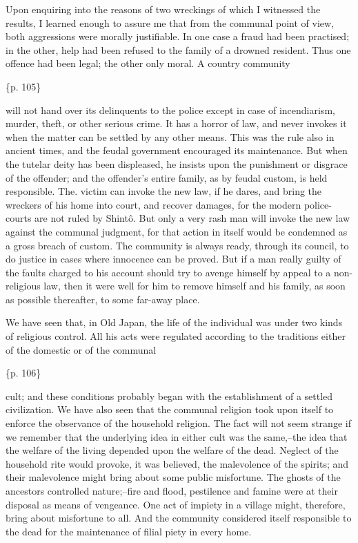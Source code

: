 Upon enquiring into the reasons of two wreckings of which I witnessed the results, I learned enough to assure me that from the communal point of view, both aggressions were morally justifiable. In one case a fraud had been practised; in the other, help had been refused to the family of a drowned resident. Thus one offence had been legal; the other only moral. A country community

\{p. 105\}

will not hand over its delinquents to the police except in case of incendiarism, murder, theft, or other serious crime. It has a horror of law, and never invokes it when the matter can be settled by any other means. This was the rule also in ancient times, and the feudal government encouraged its maintenance. But when the tutelar deity has been displeased, he insists upon the punishment or disgrace of the offender; and the offender's entire family, as by feudal custom, is held responsible. The. victim can invoke the new law, if he dares, and bring the wreckers of his home into court, and recover damages, for the modern police-courts are not ruled by Shintô. But only a very rash man will invoke the new law against the communal judgment, for that action in itself would be condemned as a gross breach of custom. The community is always ready, through its council, to do justice in cases where innocence can be proved. But if a man really guilty of the faults charged to his account should try to avenge himself by appeal to a non-religious law, then it were well for him to remove himself and his family, as soon as possible thereafter, to some far-away place.



We have seen that, in Old Japan, the life of the individual was under two kinds of religious control. All his acts were regulated according to the traditions either of the domestic or of the communal

\{p. 106\}

cult; and these conditions probably began with the establishment of a settled civilization. We have also seen that the communal religion took upon itself to enforce the observance of the household religion. The fact will not seem strange if we remember that the underlying idea in either cult was the same,--the idea that the welfare of the living depended upon the welfare of the dead. Neglect of the household rite would provoke, it was believed, the malevolence of the spirits; and their malevolence might bring about some public misfortune. The ghosts of the ancestors controlled nature;--fire and flood, pestilence and famine were at their disposal as means of vengeance. One act of impiety in a village might, therefore, bring about misfortune to all. And the community considered itself responsible to the dead for the maintenance of filial piety in every home.

